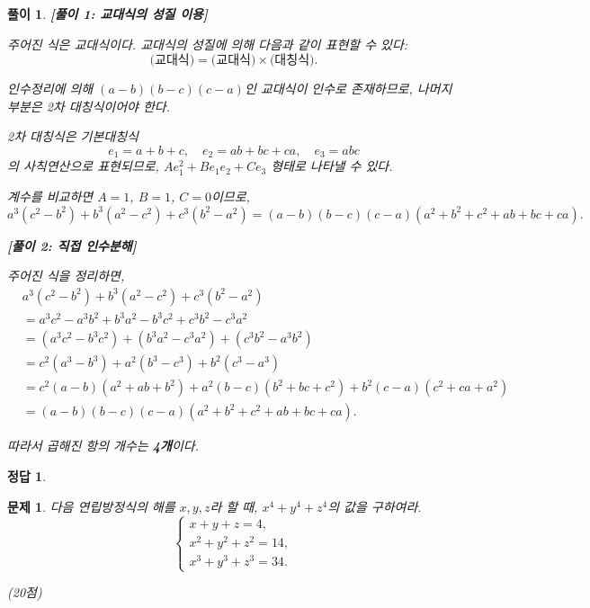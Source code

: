 \documentclass[12pt,a4paper]{article}
\theoremstyle{test_form}
\newtheorem{problem}{문제}[section]
\newtheorem*{solution}{풀이}
\newtheorem*{answer}{정답}
\begin{document}
\begin{solution}

\setlength{\parindent}{0pt}

\textbf{[풀이 1: 교대식의 성질 이용]}

주어진 식은 교대식이다. 교대식의 성질에 의해 다음과 같이 표현할 수 있다:
\[
\text{(교대식)} = \text{(교대식)} \times \text{(대칭식)}.
\]

인수정리에 의해 \((a-b)(b-c)(c-a)\)인 교대식이 인수로 존재하므로, 나머지 부분은 2차 대칭식이어야 한다.

2차 대칭식은 기본대칭식
\[
e_1=a+b+c,\quad e_2=ab+bc+ca,\quad e_3=abc
\]
의 사칙연산으로 표현되므로, \(Ae_1^2 + Be_1e_2 + Ce_3\) 형태로 나타낼 수 있다.

계수를 비교하면 \(A=1\), \(B=1\), \(C=0\)이므로,
\[
a^3(c^2-b^2)+b^3(a^2-c^2)+c^3(b^2-a^2)
=(a-b)(b-c)(c-a)(a^2+b^2+c^2+ab+bc+ca).
\]

\textbf{[풀이 2: 직접 인수분해]}

주어진 식을 정리하면,
\[
\begin{aligned}
&a^3(c^2-b^2)+b^3(a^2-c^2)+c^3(b^2-a^2)\\
&=a^3c^2-a^3b^2+b^3a^2-b^3c^2+c^3b^2-c^3a^2\\
&=(a^3c^2-b^3c^2)+(b^3a^2-c^3a^2)+(c^3b^2-a^3b^2)\\
&=c^2(a^3-b^3)+a^2(b^3-c^3)+b^2(c^3-a^3)\\
&=c^2(a-b)(a^2+ab+b^2)+a^2(b-c)(b^2+bc+c^2)+b^2(c-a)(c^2+ca+a^2)\\
&=(a-b)(b-c)(c-a)(a^2+b^2+c^2+ab+bc+ca).
\end{aligned}
\]

따라서 곱해진 항의 개수는 \textbf{4개}이다.
\end{solution}

\begin{answer}
\hfill {}
\end{answer}

\newpage

\begin{problem}
다음 연립방정식의 해를 \(x,y,z\)라 할 때, \(x^{4}+y^{4}+z^{4}\)의 값을 구하여라.
\[
\begin{cases}
x+y+z=4,\\[2pt]
x^{2}+y^{2}+z^{2}=14,\\[2pt]
x^{3}+y^{3}+z^{3}=34.
\end{cases}
\]
\begin{flushright}(20점)\end{flushright}
\end{problem}
\end{document}
